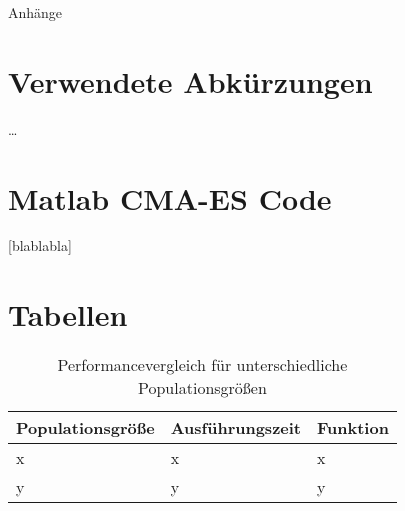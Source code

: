 ﻿\begin{appendix}

\newpage
\huge{Anhänge}
\normalsize
\thispagestyle{plain}
\section{Verwendete Abkürzungen}
\dots{}

\newpage
\thispagestyle{plain}
\section{Matlab CMA-ES Code}
\label{lst:cmaes-mat-code}[blablabla]

\newpage
\thispagestyle{plain}
\section{Tabellen}
  \label{tbl:population-compare}

    \begin{table}[h]
      \centering

    \begin{tabular}{lll}
	\hline
	\textbf{Populationsgröße} & \textbf{Ausführungszeit} & \textbf{Funktion}\\\hline
	x & x & x \\
	y & y & y \\

      \end{tabular}
    \caption{Performancevergleich für unterschiedliche Populationsgrößen}
    \end{table}

\end{appendix}
